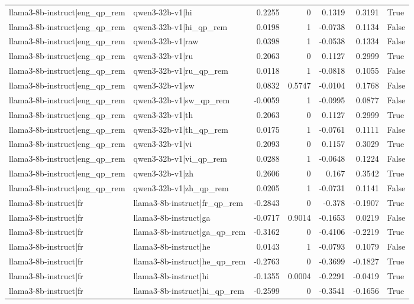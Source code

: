 \begin{table}
\begin{tabular}{l l r r r r l}
llama3-8b-instruct|eng_qp_rem & qwen3-32b-v1|hi & 0.2255 & 0 & 0.1319 & 0.3191 & True \\
llama3-8b-instruct|eng_qp_rem & qwen3-32b-v1|hi_qp_rem & 0.0198 & 1 & -0.0738 & 0.1134 & False \\
llama3-8b-instruct|eng_qp_rem & qwen3-32b-v1|raw & 0.0398 & 1 & -0.0538 & 0.1334 & False \\
llama3-8b-instruct|eng_qp_rem & qwen3-32b-v1|ru & 0.2063 & 0 & 0.1127 & 0.2999 & True \\
llama3-8b-instruct|eng_qp_rem & qwen3-32b-v1|ru_qp_rem & 0.0118 & 1 & -0.0818 & 0.1055 & False \\
llama3-8b-instruct|eng_qp_rem & qwen3-32b-v1|sw & 0.0832 & 0.5747 & -0.0104 & 0.1768 & False \\
llama3-8b-instruct|eng_qp_rem & qwen3-32b-v1|sw_qp_rem & -0.0059 & 1 & -0.0995 & 0.0877 & False \\
llama3-8b-instruct|eng_qp_rem & qwen3-32b-v1|th & 0.2063 & 0 & 0.1127 & 0.2999 & True \\
llama3-8b-instruct|eng_qp_rem & qwen3-32b-v1|th_qp_rem & 0.0175 & 1 & -0.0761 & 0.1111 & False \\
llama3-8b-instruct|eng_qp_rem & qwen3-32b-v1|vi & 0.2093 & 0 & 0.1157 & 0.3029 & True \\
llama3-8b-instruct|eng_qp_rem & qwen3-32b-v1|vi_qp_rem & 0.0288 & 1 & -0.0648 & 0.1224 & False \\
llama3-8b-instruct|eng_qp_rem & qwen3-32b-v1|zh & 0.2606 & 0 & 0.167 & 0.3542 & True \\
llama3-8b-instruct|eng_qp_rem & qwen3-32b-v1|zh_qp_rem & 0.0205 & 1 & -0.0731 & 0.1141 & False \\
llama3-8b-instruct|fr & llama3-8b-instruct|fr_qp_rem & -0.2843 & 0 & -0.378 & -0.1907 & True \\
llama3-8b-instruct|fr & llama3-8b-instruct|ga & -0.0717 & 0.9014 & -0.1653 & 0.0219 & False \\
llama3-8b-instruct|fr & llama3-8b-instruct|ga_qp_rem & -0.3162 & 0 & -0.4106 & -0.2219 & True \\
llama3-8b-instruct|fr & llama3-8b-instruct|he & 0.0143 & 1 & -0.0793 & 0.1079 & False \\
llama3-8b-instruct|fr & llama3-8b-instruct|he_qp_rem & -0.2763 & 0 & -0.3699 & -0.1827 & True \\
llama3-8b-instruct|fr & llama3-8b-instruct|hi & -0.1355 & 0.0004 & -0.2291 & -0.0419 & True \\
llama3-8b-instruct|fr & llama3-8b-instruct|hi_qp_rem & -0.2599 & 0 & -0.3541 & -0.1656 & True \\

\end{tabular}
\end{table}
